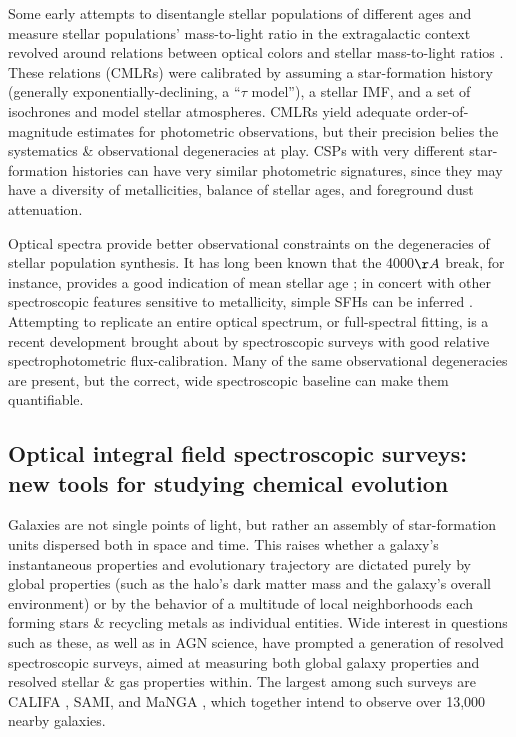 Some early attempts to disentangle stellar populations of different ages and measure stellar populations' mass-to-light ratio in the extragalactic context revolved around relations between optical colors and stellar mass-to-light ratios \citep[see][]{bell_dejong_01, bell_03}. These relations (CMLRs) were calibrated by assuming a star-formation history (generally exponentially-declining, a ``$\tau$ model''), a stellar IMF, and a set of isochrones and model stellar atmospheres. CMLRs yield adequate order-of-magnitude estimates for photometric observations, but their precision belies the systematics \& observational degeneracies at play. CSPs with very different star-formation histories can have very similar photometric signatures, since they may have a diversity of metallicities, balance of stellar ages, and foreground dust attenuation.

Optical spectra provide better observational constraints on the degeneracies of stellar population synthesis. It has long been known that the 4000$\AA$ break, for instance, provides a good indication of mean stellar age \citep{bruzual_83,balogh_99,balogh_00}; in concert with other spectroscopic features sensitive to metallicity, simple SFHs can be inferred \citep{worthey_faber_92, worthey_94, worthey_ottaviani_97}. Attempting to replicate an entire optical spectrum, or full-spectral fitting, is a recent development brought about by spectroscopic surveys with good relative spectrophotometric flux-calibration. Many of the same observational degeneracies are present, but the correct, wide spectroscopic baseline can make them quantifiable.

\subsection{Optical integral field spectroscopic surveys: new tools for studying chemical evolution}

Galaxies are not single points of light, but rather an assembly of star-formation units dispersed both in space and time.  This raises whether a galaxy’s instantaneous properties and evolutionary trajectory are dictated purely by global properties (such as the halo’s dark matter mass and the galaxy’s overall environment) or by the behavior of a multitude of local neighborhoods each forming stars \& recycling metals as individual entities. Wide interest in questions such as these, as well as in AGN science, have prompted a generation of resolved spectroscopic surveys, aimed at measuring both global galaxy properties and resolved stellar \& gas properties within. The largest among such surveys are CALIFA \citep{sanchez_12_califa-survey}, SAMI\citep{bryant_15_sami-survey}, and MaNGA \citep{bundy15_manga}, which together intend to observe over 13,000 nearby galaxies.

